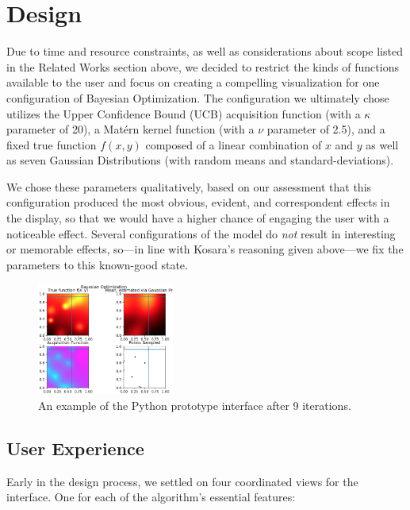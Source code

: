 \documentclass{vgtc}                          %
\begin{document}
\section{Design}

Due to time and resource constraints, as well as considerations about scope
listed in the Related Works section above, we decided to restrict the kinds of
functions available to the user and focus on creating a compelling
visualization for one configuration of Bayesian Optimization. The configuration
we ultimately chose utilizes the Upper Confidence Bound (UCB) acquisition
function (with a $\kappa$ parameter of 20), a Matérn kernel function (with a
$\nu$ parameter of 2.5), and a fixed true function $f(x,y)$ composed of a
linear combination of $x$ and $y$ as well as seven Gaussian Distributions (with
random means and standard-deviations).

We chose these parameters qualitatively, based on our assessment that this
configuration produced the most obvious, evident, and correspondent effects in
the display, so that we would have a higher chance of engaging the user with a
noticeable effect. Several configurations of the model do \textit{not} result
in interesting or memorable effects, so---in line with Kosara's reasoning given
above---we fix the parameters to this known-good state.

\begin{figure}
	\begin{center}
		\includegraphics[width=0.4\textwidth]{fig1-full}
	\end{center}
	\caption{An example of the Python prototype interface after 9 iterations.}
	\label{f1}
\end{figure}

\subsection{User Experience}

Early in the design process, we settled on four coordinated views for the
interface. One for each of the algorithm's essential features:
\end{document}
